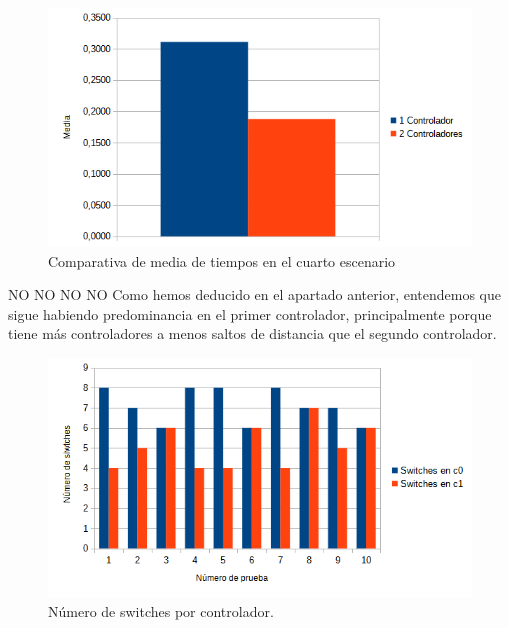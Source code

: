 \documentclass[a4paper, 12pt]{book}
\begin{document}
	\begin{figure}[H]
		\centering
		\includegraphics[width=13cm, keepaspectratio]{img/comparativamediaescenario4}
		\caption{Comparativa de media de tiempos en el cuarto escenario}
		\label{figura:mediaescenario4}
	\end{figure}
	

	

	
%	
	
	
	NO NO NO NO
	Como hemos deducido en el apartado anterior, entendemos que sigue habiendo predominancia en el primer controlador, principalmente porque tiene más controladores a menos saltos de distancia que el segundo controlador. 

	
	
	\begin{figure}[H]
		\centering
		\includegraphics[width=16cm, keepaspectratio]{img/switchesporcontrollerescenario3}
		\caption{Número de switches por controlador.}
		\label{figura:switchesporcontrollerescenario4}
	\end{figure}
	
\end{document}
